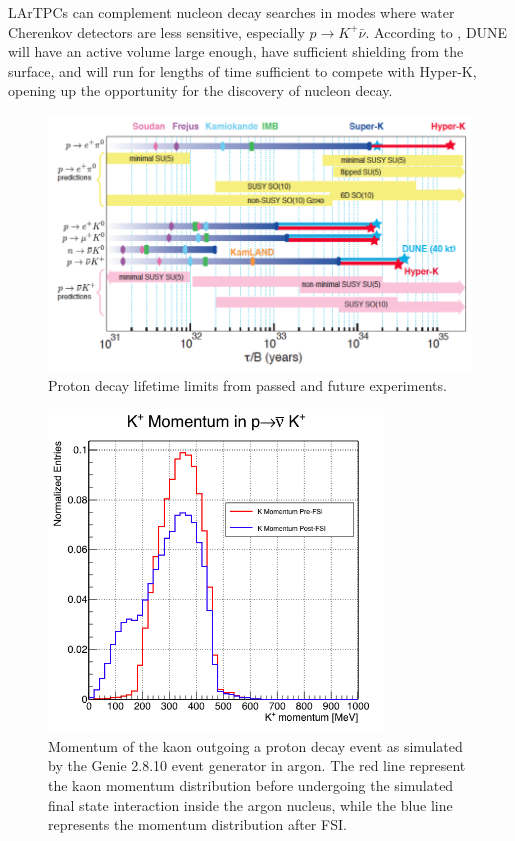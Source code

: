 LArTPCs can complement nucleon decay searches in modes where water Cherenkov detectors are less sensitive, especially $p\rightarrow K^+\bar{\nu}$. According to \cite{Acciarri:Dune}, DUNE will have an active volume large enough, have sufficient shielding from the surface, and will run for lengths of time sufficient to compete with Hyper-K, opening up the opportunity for the discovery of nucleon decay. 

\begin{figure}[hbpt]
\centering
\includegraphics[width=6.5in]{Chapter-2/Images/PDKExperimentalLImit.png}
\caption{Proton decay lifetime limits from passed and future experiments.}
\label{fig:PDKExperimentalLImit}
\end{figure}


\begin{figure}[hbpt]
\centering
\includegraphics[width=3.5in]{Chapter-2/Images/pdkGenie.png}
\caption{Momentum of the kaon outgoing a proton decay event as simulated by the Genie 2.8.10 event generator in argon. The red line represent the kaon momentum distribution before undergoing the simulated final state interaction inside the argon nucleus, while the blue line represents the momentum distribution after FSI. }
\label{fig:PDKGENIE}
\end{figure}


